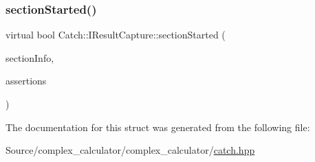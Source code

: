 \mbox{\label{struct_catch_1_1_i_result_capture_a5b76ed52badcb64cf374202e12b81a03}} 
\subsubsection{\texorpdfstring{section\+Started()}{sectionStarted()}}
{\footnotesize\ttfamily virtual bool Catch\+::\+I\+Result\+Capture\+::section\+Started (\begin{DoxyParamCaption}\item[{\mbox{\hyperlink{struct_catch_1_1_section_info}{Section\+Info}} const \&}]{section\+Info,  }\item[{\mbox{\hyperlink{struct_catch_1_1_counts}{Counts}} \&}]{assertions }\end{DoxyParamCaption})\hspace{0.3cm}{\ttfamily [pure virtual]}}



The documentation for this struct was generated from the following file\+:\begin{DoxyCompactItemize}
\item 
Source/complex\+\_\+calculator/complex\+\_\+calculator/\mbox{\hyperlink{catch_8hpp}{catch.\+hpp}}\end{DoxyCompactItemize}
